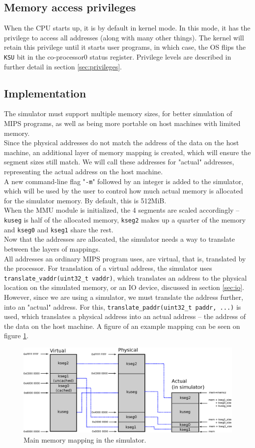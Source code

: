 \subsection{Memory access privileges}
When the CPU starts up, it is by default in kernel mode. In this mode, it has
the privilege to access all addresses (along with many other things). The
kernel will retain this privilege until it starts user programs, in which case,
the OS flips the \texttt{KSU} bit in the co-processor0 status register\cite{harvard_mips_summary}.
Privilege levels are described in further detail in section
\ref{sec:privileges}.


\subsection{Implementation}
The simulator must support multiple memory sizes, for better simulation of
MIPS programs, as well as being more portable on host machines with limited
memory.\\
Since the physical addresses do not match the address of the data on the host
machine, an additional layer of memory mapping is created, which will ensure the
segment sizes still match. We will call these addresses for "actual" addresses,
representing the actual address on the host machine.\\
A new command-line flag "\texttt{-m}" followed by an integer is added to the
simulator, which will be used by the user to control how much actual memory is allocated
for the simulator memory. By default, this is 512MiB.\\
When the MMU module is initialized, the 4 segments are scaled accordingly --
\texttt{kuseg} is half of the allocated memory, \texttt{kseg2} makes up a quarter
of the memory and \texttt{kseg0} and \texttt{kseg1} share the rest.\\
Now that the addresses are allocated, the simulator needs a way to translate
between the layers of mappings.\\
All addresses an ordinary MIPS program uses, are virtual, that is, translated by
the processor. For translation of a virtual address, the simulator uses
\texttt{translate\_vaddr(uint32\_t vaddr)}, which translates an address to the
physical location on the simulated memory, or an IO device, discussed in section
\ref {sec:io}. However, since we are using a simulator, we must translate the
address further, into an "actual" address. For this, \texttt{translate\_paddr(uint32\_t paddr, ...)}
is used, which translates a physical address into an actual address -- the
address of the data on the host machine. A figure of an example mapping can be
seen on figure \ref{fig:address_space_mapping}.\\


\begin{figure}[h]
	\includegraphics[width=\textwidth]{mmu/memory_mapping.eps}
	\caption{Main memory mapping in the simulator.}
	\label{fig:address_space_mapping}
\end{figure}


